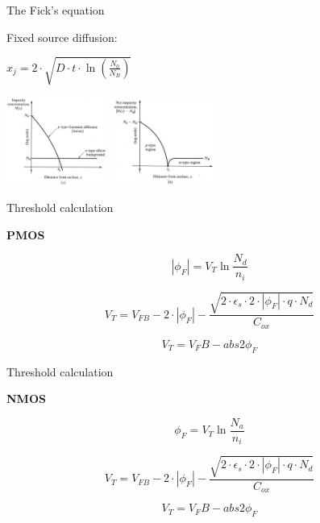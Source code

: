 \documentclass[aspectratio=169]{beamer}
\begin{document}
\begin{frame}{The Fick's equation}
	\begin{center}
		Fixed source diffusion:

		$ x_j = 2 \cdot\sqrt{D \cdot t \cdot \ln\left(\frac{N_0}{N_B}\right)} $

		\includegraphics[width=0.25\textwidth]{images/well_formation1.png}
		\includegraphics[width=0.25\textwidth]{images/well_formation2.png}
	\end{center}
\end{frame}

\begin{frame}{Threshold calculation}
	\begin{center}
		\textbf{PMOS}

		\begin{equation}
			\left| \phi_F \right| = V_T \ln\frac{N_d}{n_i}
		\end{equation}

		\begin{equation}
			V_T
			=
			V_{FB}
			-
			2 \cdot \left| \phi_F \right|
			-
			\frac{
			\sqrt{2 \cdot \epsilon_s \cdot 2 \cdot \left| \phi_F \right| \cdot q \cdot N_d }
			}{C_{ox}}
		\end{equation}

		\begin{equation}
			V_T = V_FB - abs{2 \phi_F}
		\end{equation}
	\end{center}
\end{frame}

\begin{frame}{Threshold calculation}
	\begin{center}
		\textbf{NMOS}

		\begin{equation}
			\phi_F = V_T \ln\frac{N_a}{n_i}
		\end{equation}

		\begin{equation}
			V_T
			=
			V_{FB}
			-
			2 \cdot \left| \phi_F \right|
			-
			\frac{
			\sqrt{2 \cdot \epsilon_s \cdot 2 \cdot \left| \phi_F \right| \cdot q \cdot N_d }
			}{C_{ox}}
		\end{equation}

		\begin{equation}
			V_T = V_FB - abs{2 \phi_F}
		\end{equation}
	\end{center}
\end{frame}
\end{document}

